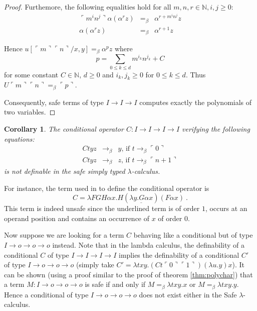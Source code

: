 \documentclass{article}
\newtheorem{corollary}[theorem]{Corollary}
\newcommand{\encode}[1]{\ulcorner #1 \urcorner}
\newcommand{\nat}{\mathbb{N}}
\begin{document}
\begin{proof}
Furthemore, the following equalities hold for all $m,n,r\in \nat,i,j\geq 0$:
\begin{eqnarray*}
\encode{m^i n^j} \alpha (\alpha^r z) &=_\beta&
\alpha^{r + m^i n^j} z \\
\alpha ( \alpha^r z ) &=_\beta& \alpha^{r+1} z
\end{eqnarray*}

Hence $u[\encode{m} \encode{n}/x,y] =_\beta \alpha^p z$ where
$$ p = \sum_{0\leq k \leq d} m^{i_k} n^{j_k} + C$$
for some constant $C \in \nat$, $d\geq 0$ and $i_k,j_k \geq 0$ for $0 \leq k \leq d$. Thus $U \encode{m} \encode{n} =_\beta \encode{p}$. 

Consequently, safe terms of type $I \rightarrow I \rightarrow I$ computes
exactly the polynomials of two variables.
\end{proof}

\begin{corollary}
The conditional operator $C:I\rightarrow I\rightarrow I \rightarrow I$ verifying the following equations:
\begin{eqnarray*}
C t y z &\rightarrow_\beta& y \mbox{, if } t \rightarrow_\beta \encode{0} \\
C t y z &\rightarrow_\beta& z \mbox{, if } t \rightarrow_\beta \encode{n+1}
\end{eqnarray*}
is not definable in the safe simply typed $\lambda$-calculus.
\end{corollary}

For instance, the term used in \cite{citeulike:622637} to define the conditional operator is
$$ C = \lambda F G H \alpha x . H ( \underline{\lambda y . G \alpha x} ) (F \alpha x) \ .$$
This term is indeed unsafe since the underlined term is of order $1$, occurs at an operand position and contains an occurrence of $x$ of order $0$.

Now suppose we are looking for a term $C$ behaving like a conditional but of type $I\rightarrow o\rightarrow o \rightarrow o$ instead. Note that in the lambda calculus, the definability of a conditional $C$ of type $I\rightarrow I\rightarrow I \rightarrow I$ implies the definability of a conditional $C'$ of type $I\rightarrow o\rightarrow o \rightarrow o$ (simply take $C' = \lambda t x y . (C t \encode{0} \encode{1}) (\lambda u . y) x$).
It  can be shown (using a proof similar to the proof of theorem \ref{thm:polychar}) that a term $M:I\rightarrow o\rightarrow o \rightarrow o$  is safe if and only if $M =_\beta \lambda t x y . x$  or $M =_\beta \lambda t x y . y$. Hence a conditional of type $I\rightarrow o\rightarrow o \rightarrow o$ does not exist either in the Safe $\lambda$-calculus.
\end{document}
